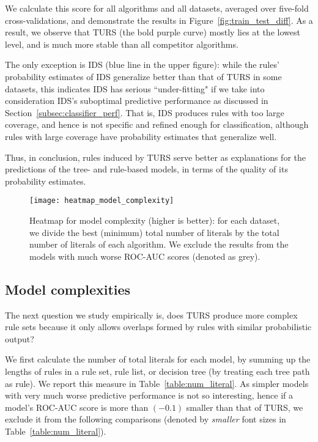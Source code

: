 We calculate this score for all algorithms and all datasets, averaged over five-fold cross-validations, and demonstrate the results in Figure~\ref{fig:train_test_diff}. As a result, we observe that TURS (the bold purple curve) mostly lies at the lowest level, and is much more stable than all competitor algorithms. 

The only exception is IDS (blue line in the upper figure): while the rules' probability estimates of IDS generalize better than that of TURS in some datasets, this indicates IDS has serious ``under-fitting" if we take into consideration IDS's suboptimal predictive performance as discussed in Section~\ref{subsec:classifier_perf}. That is, IDS produces rules with too large coverage, and hence is not specific and refined enough for classification, although rules with large coverage have probability estimates that generalize well. 


Thus, in conclusion, rules induced by TURS serve better as explanations for the predictions of the tree- and rule-based models, in terms of the quality of its probability estimates. 

%


\begin{figure}[ht]
	\texttt{[image: heatmap\_model\_complexity]}
	\caption{Heatmap for model complexity (higher is better): for each dataset, we divide the best (minimum) total number of literals by the total number of literals of each algorithm. We exclude the results from the models with much worse ROC-AUC scores (denoted as grey).}	 
	\label{fig:heatmap_modelcomplexity}
\end{figure}

\subsection{Model complexities}
The next question we study empirically is, does TURS produce more complex rule sets because it only allows overlaps formed by rules with similar probabilistic output? 

We first calculate the number of total literals for each model, by summing up the lengths of rules in a rule set, rule list, or decision tree (by treating each tree path as rule). 
We report this measure in Table~\ref{table:num_literal}. As simpler models with very much worse predictive performance is not so interesting, hence if a model's ROC-AUC score is more than $(-0.1)$ smaller than that of TURS, we exclude it from the following comparisons (denoted by \emph{smaller} font sizes in Table~\ref{table:num_literal}). 

